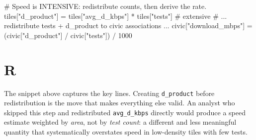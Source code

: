 \documentclass[
  letterpaper,
  DIV=11,
  numbers=noendperiod]{scrreprt}
\newenvironment{Shaded}{\begin{snugshade}}{\end{snugshade}}
\newcommand{\AttributeTok}[1]{\textcolor[rgb]{0.40,0.45,0.13}{#1}}
\newcommand{\CommentTok}[1]{\textcolor[rgb]{0.37,0.37,0.37}{#1}}
\newcommand{\DecValTok}[1]{\textcolor[rgb]{0.68,0.00,0.00}{#1}}
\newcommand{\FunctionTok}[1]{\textcolor[rgb]{0.28,0.35,0.67}{#1}}
\newcommand{\NormalTok}[1]{\textcolor[rgb]{0.00,0.23,0.31}{#1}}
\newcommand{\OperatorTok}[1]{\textcolor[rgb]{0.37,0.37,0.37}{#1}}
\newcommand{\OtherTok}[1]{\textcolor[rgb]{0.00,0.23,0.31}{#1}}
\newcommand{\SpecialCharTok}[1]{\textcolor[rgb]{0.37,0.37,0.37}{#1}}
\newcommand{\StringTok}[1]{\textcolor[rgb]{0.13,0.47,0.30}{#1}}
\begin{document}
\begin{Shaded}
\begin{Highlighting}[]
\CommentTok{\# Speed is INTENSIVE: redistribute counts, then derive the rate.}
\NormalTok{tiles[}\StringTok{"d\_product"}\NormalTok{] }\OperatorTok{=}\NormalTok{ tiles[}\StringTok{"avg\_d\_kbps"}\NormalTok{] }\OperatorTok{*}\NormalTok{ tiles[}\StringTok{"tests"}\NormalTok{]   }\CommentTok{\# extensive}
\CommentTok{\# ... redistribute tests + d\_product to civic associations ...}
\NormalTok{civic[}\StringTok{"download\_mbps"}\NormalTok{] }\OperatorTok{=}\NormalTok{ (civic[}\StringTok{"d\_product"}\NormalTok{] }\OperatorTok{/}\NormalTok{ civic[}\StringTok{"tests"}\NormalTok{]) }\OperatorTok{/} \DecValTok{1000}
\end{Highlighting}
\end{Shaded}

\section{R}

\begin{Shaded}
\end{Shaded}

The snippet above captures the key lines. Creating \texttt{d\_product}
before redistribution is the move that makes everything else valid. An
analyst who skipped this step and redistributed \texttt{avg\_d\_kbps}
directly would produce a speed estimate weighted by \emph{area}, not by
\emph{test count}: a different and less meaningful quantity that
systematically overstates speed in low-density tiles with few tests.
\end{document}
